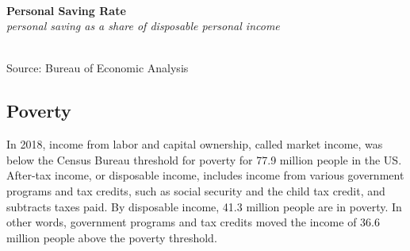 \documentclass{report}
\makeatletter
\newcommand{\tbllink}[1]{\href{https://raw.githubusercontent.com/bdecon/US-chartbook/master/chartbook/data/#1}{\faTable}}
\newcommand*\short[1]{\expandafter\@gobbletwo\number\numexpr#1\relax}
\newcommand{\dateaxisticks}{
		date coordinates in=x, axis line style={draw=none},
		xmax={2020-02-01},
		max space between ticks=40,	    
		xtick={{1990-01-01}, {1992-01-01}, {1994-01-01}, 
			{1996-01-01}, {1998-01-01}, {2000-01-01}, 
			{2002-01-01}, {2004-01-01}, {2006-01-01},
			{2008-01-01}, {2010-01-01}, {2012-01-01}, {2014-01-01},
		    {2016-01-01}, {2018-01-01}, {2020-01-01}},
		minor xtick={{1989-01-01}, {1991-01-01}, {1993-01-01},
			{1995-01-01}, {1997-01-01}, {1999-01-01}, 
			{2001-01-01}, {2003-01-01}, {2005-01-01}, {2007-01-01},
		    {2009-01-01}, {2011-01-01}, {2013-01-01}, {2015-01-01},
		    {2017-01-01}, {2019-01-01}},
		enlarge y limits={0.06}, enlarge x limits={0.01},
		}
\newcommand{\bbar}[2]{extra #1 ticks = {{#2}}, extra #1 tick labels = ,
		extra #1 tick style = {grid=major, grid style={thick, black!25}},}
\newcommand{\stdline}[4]{\addplot[very thick, no markers, color=#1] 
		table [x=#2, y=#3, col sep=comma] {#4};	}
\newcommand{\rbars}{
		\fill[color=black!10] (axis cs:{1990-07-01},\pgfkeysvalueof{/pgfplots/ymin}) rectangle 
			(axis cs:{1991-03-01}, \pgfkeysvalueof{/pgfplots/ymax});
		\fill[color=black!10] (axis cs:{2007-12-01},\pgfkeysvalueof{/pgfplots/ymin}) rectangle 
			(axis cs:{2009-07-01}, \pgfkeysvalueof{/pgfplots/ymax});
		\fill[color=black!10] (axis cs:{2001-03-01},\pgfkeysvalueof{/pgfplots/ymin}) rectangle 
			(axis cs:{2001-11-01}, \pgfkeysvalueof{/pgfplots/ymax});}
\makeatother
\begin{document}
{{{\begin{minipage}{0.76\textwidth}
\\

\vspace{2mm}

\noindent \normalsize \textbf{Personal Saving Rate}\\
\footnotesize{\textit{personal saving as a share of disposable personal income}}\\
\noindent \hspace*{-2mm} \\
\footnotesize{Source: Bureau of Economic Analysis} \hspace{66mm} \tbllink{psavert.csv}


\end{minipage}

\newpage

\subsection*{\color{black!70} \seriffont Poverty}

\begin{minipage}{0.43\textwidth}
\small
In 2018, income from labor and capital ownership, called market income, was below the Census Bureau threshold for poverty for 77.9 million people in the US. After-tax income, or disposable income, includes income from various government programs and tax credits, such as social security and the child tax credit, and subtracts taxes paid. By disposable income, 41.3 million people are in poverty. In other words, government programs and tax credits moved the income of 36.6 million people above the poverty threshold. \\


\end{minipage}}}}
\end{document}
